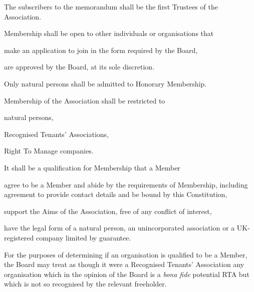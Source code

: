 \documentclass[10pt]{mk-articles-of-association}
\newcommand{\EC}[0]{Board}
\newcommand{\Exec}[0]{\EC{} }
\newcommand{\RTA}[0]{Recognised Tenants' Association}
\begin{document}
\begin{constenum}

  \item The subscribers to the memorandum shall be the first Trustees
    of the Association.

  \item Membership shall be open to other individuals or organisations that
    \begin{constenum}
      \item make an application to join in the form required by the \EC, \ITand
      \item are approved by the \EC{}, at its sole discretion.
    \end{constenum}

  \item Only natural persons shall be admitted to Honorary Membership.

  \item Membership of the Association shall be restricted to
    \begin{constenum}
    \item natural persons,
    \item \RTA{}s, \ITand
    \item Right To Manage companies.
    \end{constenum}

  \item It shall be a qualification for Membership that a Member
    \begin{constenum}

    \item agree to be a Member and abide by the requirements of
      Membership, including agreement to provide contact details and
      be bound by this Constitution,

    \item support the Aims of the Association, free of any conflict
      of interest, \ITand

    \item have the legal form of a natural person, an unincorporated
      association or a UK-registered company limited by guarantee.

    \end{constenum}

  \item For the purposes of determining if an organisation is
    qualified to be a Member, the \Exec may treat as though it were a
    \RTA{} any organisation which in the opinion of the \Exec is a
    \textit{bona fide} potential RTA but which is not so recognised by
    the relevant freeholder.



\end{constenum}
\end{document}
